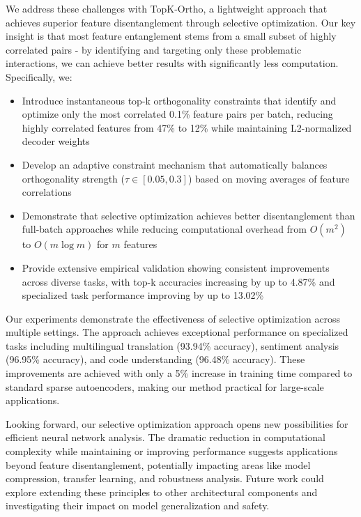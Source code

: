 \documentclass{article} %
\begin{document}
We address these challenges with TopK-Ortho, a lightweight approach that achieves superior feature disentanglement through selective optimization. Our key insight is that most feature entanglement stems from a small subset of highly correlated pairs - by identifying and targeting only these problematic interactions, we can achieve better results with significantly less computation. Specifically, we:
\begin{itemize}
    \item Introduce instantaneous top-k orthogonality constraints that identify and optimize only the most correlated 0.1\% feature pairs per batch, reducing highly correlated features from 47\% to 12\% while maintaining L2-normalized decoder weights
    \item Develop an adaptive constraint mechanism that automatically balances orthogonality strength ($\tau \in [0.05, 0.3]$) based on moving averages of feature correlations
    \item Demonstrate that selective optimization achieves better disentanglement than full-batch approaches while reducing computational overhead from $O(m^2)$ to $O(m\log m)$ for $m$ features
    \item Provide extensive empirical validation showing consistent improvements across diverse tasks, with top-k accuracies increasing by up to 4.87\% and specialized task performance improving by up to 13.02\%
\end{itemize}

Our experiments demonstrate the effectiveness of selective optimization across multiple settings. The approach achieves exceptional performance on specialized tasks including multilingual translation (93.94\% accuracy), sentiment analysis (96.95\% accuracy), and code understanding (96.48\% accuracy). These improvements are achieved with only a 5\% increase in training time compared to standard sparse autoencoders, making our method practical for large-scale applications.

Looking forward, our selective optimization approach opens new possibilities for efficient neural network analysis. The dramatic reduction in computational complexity while maintaining or improving performance suggests applications beyond feature disentanglement, potentially impacting areas like model compression, transfer learning, and robustness analysis. Future work could explore extending these principles to other architectural components and investigating their impact on model generalization and safety.
\end{document}
